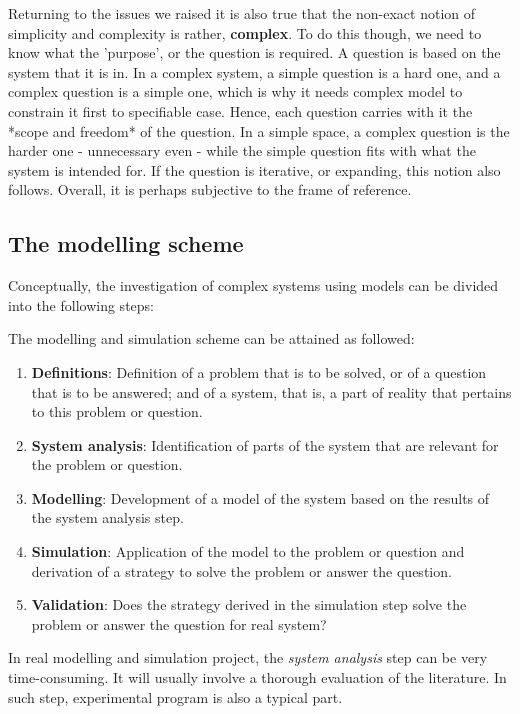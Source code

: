 Returning to the issues we raised it is also true that the non-exact notion of simplicity and complexity is rather, \textbf{complex}. To do this though, we need to know what the 'purpose', or the question is required. A question is based on the system that it is in. In a complex system, a simple question is a hard one, and a complex question is a simple one, which is why it needs complex model to constrain it first to specifiable case. Hence, each question carries with it the *scope and freedom* of the question. In a simple space, a complex question is the harder one - unnecessary even - while the simple question fits with what the system is intended for. If the question is iterative, or expanding, this notion also follows. Overall, it is perhaps subjective to the frame of reference. 

\subsection{The modelling scheme}
Conceptually, the investigation of complex systems using models can be divided into the following steps: 

\begin{proposition}
    The modelling and simulation scheme can be attained as followed: 
    \begin{enumerate}[noitemsep]
        \item \textbf{Definitions}: Definition of a problem that is to be solved, or of a question that is to be answered; and of a system, that is, a part of reality that pertains to this problem or question.
        \item \textbf{System analysis}: Identification of parts of the system that are relevant for the problem or question. 
        \item \textbf{Modelling}: Development of a model of the system based on the results of the system analysis step. 
        \item \textbf{Simulation}: Application of the model to the problem or question and derivation of a strategy to solve the problem or answer the question. 
        \item \textbf{Validation}: Does the strategy derived in the simulation step solve the problem or answer the question for real system?
    \end{enumerate}
\end{proposition}
In real modelling and simulation project, the \textit{system analysis} step can be very time-consuming. It will usually involve a thorough evaluation of the literature. In such step, experimental program is also a typical part. 


